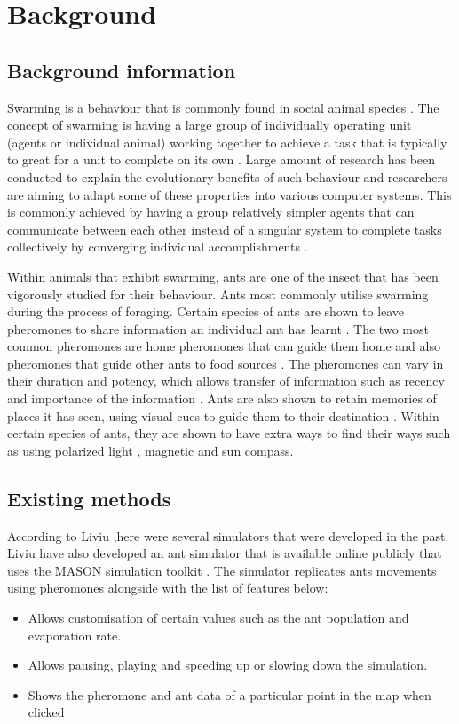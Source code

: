 \documentclass[a4paper, oneside, 11pt]{report}
\begin{document}
\chapter{Background}
\label{chap:background}
\section{Background information}
Swarming is a behaviour that is commonly found in social animal species \citep{Swarm_Animals}. The concept of swarming is having a large group of individually operating unit (agents or individual animal) working together to achieve a task that is typically to great for a unit to complete on its own \citep{Swarm_Explanation}. Large amount of research has been conducted to explain the evolutionary benefits of such behaviour and researchers are aiming to adapt some of these properties into various computer systems. This is commonly achieved by having a group relatively simpler agents that can communicate between each other instead of a singular system to complete tasks collectively by converging individual accomplishments \citep{Swarm_Properties}.

Within animals that exhibit swarming, ants are one of the insect that has been vigorously studied for their behaviour. Ants most commonly utilise swarming during the process of foraging. Certain species of ants are shown to leave pheromones to share information an individual ant has learnt \citep{Ant_Pheromones}. The two most common pheromones are home pheromones that can guide them home and also pheromones that guide other ants to food sources \citep{Ant_Pheromones}. The pheromones can vary in their duration and potency, which allows transfer of information such as recency and importance of the information \citep{Ant_Pheromones}. Ants are also shown to retain memories of places it has seen, using visual cues to guide them to their destination \citep{Ant_Memory_1} \cite{Ant_Memory_2} \cite{Ant_Memory_3}. Within certain species of ants, they are shown to have extra ways to find their ways such as using polarized light \citep{Ant_Navigation_Light}, magnetic \citep{Ant_Navigation_Magnetic_1} \cite{Ant_Navigation_Magnetic_2} and sun \citep{Ant_Navigation_Wind} compass.


\section{Existing methods}
According to Liviu \citep{Ant_Simulator},here were several simulators that were developed in the past. Liviu have also developed an ant simulator that is available online publicly that uses the MASON simulation toolkit \citep{Mason}. The simulator replicates ants movements using pheromones alongside with the list of features below:
\begin{itemize}
	\item Allows customisation of certain values such as the ant population and evaporation rate.
	\item Allows pausing, playing and speeding up or slowing down the simulation.
	\item Shows the pheromone and ant data of a particular point in the map when clicked
\end{itemize}
\end{document}
